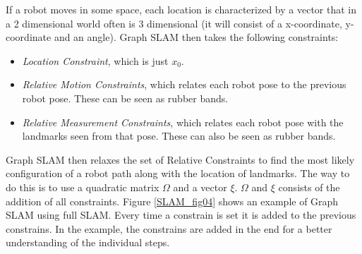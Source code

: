 If a robot moves in some space, each location is characterized by a vector that in a 2 dimensional world often is 3 dimensional (it will consist of a x-coordinate, y-coordinate and an angle). 
Graph SLAM then takes the following constraints: 
\begin{itemize}
\item \textit{Location Constraint}, which is just $x_0$.
\item \textit{Relative Motion Constraints}, which relates each robot pose to the previous robot pose. These can be seen as rubber bands.
\item \textit{Relative Measurement Constraints}, which relates each robot pose with the landmarks seen from that pose. These can also be seen as rubber bands.
\end{itemize}
Graph SLAM then relaxes the set of Relative Constraints to find the most likely configuration of a robot path along with the location of landmarks.
The way to do this is to use a quadratic matrix $\Omega$ and a vector $\xi$. $\Omega$ and $\xi$ consists of the addition of all constraints. Figure \ref{SLAM_fig04} shows an example of Graph SLAM using full SLAM. Every time a constrain is set it is added to the previous constrains. In the example, the constrains are added in the end for a better understanding of the individual steps.

